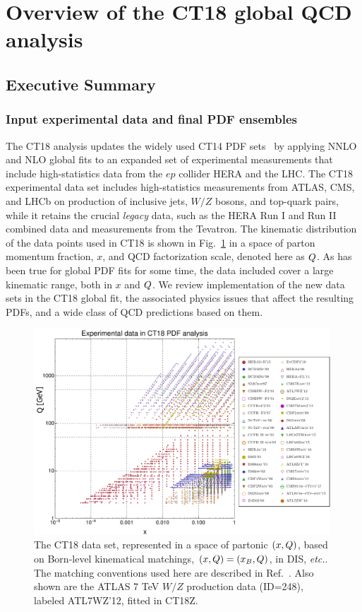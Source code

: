 \section{\label{sec:Datasets} Overview of the CT18 global QCD analysis
}

\subsection{\label{sec:summary} Executive Summary}
%
%
\subsubsection{Input experimental data and final PDF ensembles}

The CT18 analysis updates the widely used CT14 PDF sets~\cite{Dulat:2015mca}
by applying NNLO and NLO global fits to an expanded set of experimental
measurements that include high-statistics data from the $ep$ collider HERA and the LHC. The
CT18 experimental data set includes high-statistics measurements from ATLAS, CMS, and LHCb on 
production of inclusive jets, $W/Z$ bosons, and top-quark pairs, 
while it retains the crucial {\it legacy} data, such as 
the HERA Run I and Run II combined data and measurements
from the Tevatron.
The kinematic distribution of the data points used in CT18 is shown in Fig.~\ref{fig:ct18data_xmu} in a space of parton momentum fraction, 
$x$, and QCD factorization scale, denoted here as $Q$. As has been true for global PDF fits for some time, the data included cover a large kinematic range, both in $x$ and $Q$. 
%
We review implementation of the new data sets in the CT18 global fit, the associated physics issues that 
affect the resulting PDFs, and a wide class of QCD predictions based on them. 
\begin{figure}[tb]
	\includegraphics[width=0.99\textwidth]{./fig/ct18data_xmu.pdf}
	\caption{The CT18 data set, represented in a space of partonic $(x,Q)$,
		based on Born-level kinematical matchings, $(x,Q) = (x_B, Q)$, in DIS, {\it etc.}.
		The matching conventions used here are described in Ref.~\cite{Wang:2018heo}. Also
		shown are the ATLAS 7 TeV $W/Z$ production data (ID=248), labeled ATL7WZ'12, fitted
		in CT18Z.
		\label{fig:ct18data_xmu}}
\end{figure}

